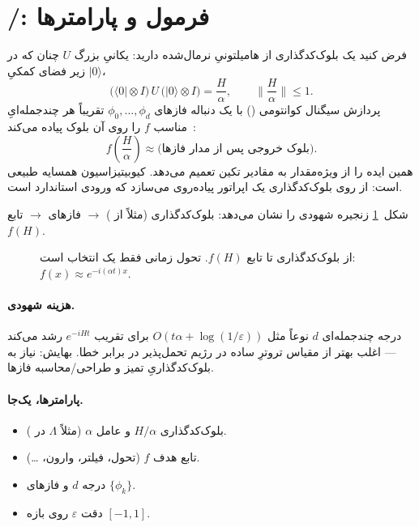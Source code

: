 \section{/: فرمول و پارامترها}
\label{sec:qsp}

فرض کنید یک بلوک‌کدگذاری از هامیلتونیِ نرمال‌شده دارید: یکانیِ بزرگ $U$ چنان که در زیر فضای کمکیِ $\lvert0\rangle$،
\begin{equation}
	\label{eq:block-enc}
	\bigl(\langle0\rvert\otimes I\bigr)\,U\,\bigl(\lvert0\rangle\otimes I\bigr)
	=
	\frac{H}{\alpha},
	\qquad
	\biggl\lVert\frac{H}{\alpha}\biggr\rVert\le 1.
\end{equation}
پردازش سیگنال کوانتومی () با یک دنباله فازهای $\phi_0,\ldots,\phi_d$ تقریباً هر چندجمله‌ایِ مناسب $f$ را روی آن بلوک پیاده می‌کند~\cite{Low2017}:
\begin{equation}
	f\!\left(\frac{H}{\alpha}\right)
	\approx
	\text{(بلوک خروجی پس از مدار فازها)}.
\end{equation}
 همین ایده را از ویژه‌مقدار به مقادیر تکین تعمیم می‌دهد. کیوبیتیزاسیون همسایه طبیعی است: از روی بلوک‌کدگذاری یک اپراتور پیاده‌روی می‌سازد که ورودی استاندارد  است.

شکل~\ref{fig:qsp-flow} زنجیره شهودی را نشان می‌دهد: بلوک‌کدگذاری (مثلاً از ) $\to$ فازهای  $\to$ تابع $f(H)$.

\begin{figure}[htbp]
	\centering
	\begin{latin}
		\resizebox{0.92\textwidth}{!}{%
		}
	\end{latin}
	\caption{از بلوک‌کدگذاری تا تابع $f(H)$. تحول زمانی فقط یک انتخاب است: $f(x)\approx e^{-i(\alpha t)x}$.}
	\label{fig:qsp-flow}
\end{figure}

\paragraph{هزینه شهودی.}
درجه چندجمله‌ای $d$ نوعاً مثل $O\!\left(t\alpha+\log(1/\varepsilon)\right)$ برای تقریب $e^{-iHt}$ رشد می‌کند --- اغلب بهتر از مقیاس تروترِ ساده در رژیم تحمل‌پذیر در برابر خطا. بهایش: نیاز به بلوک‌کدگذاریِ تمیز و طراحی/محاسبه فازها.

\paragraph{پارامترها، یک‌جا.}
\begin{itemize}
	\item بلوک‌کدگذاری $H/\alpha$ و عامل $\alpha$ (مثلاً $\Lambda$ در ).
	\item تابع هدف $f$ (تحول، فیلتر، وارون، \ldots).
	\item درجه $d$ و فازهای $\{\phi_k\}$.
	\item دقت $\varepsilon$ روی بازه $[-1,1]$.
\end{itemize}

